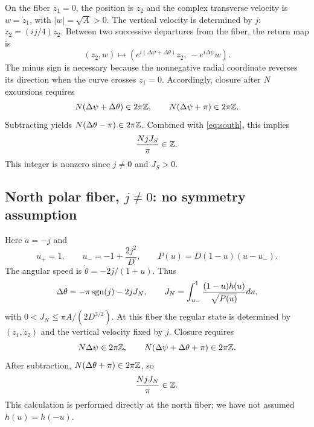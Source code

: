 \documentclass[11pt,a4paper]{article}
\theoremstyle{remark}\newtheorem{remark}[theorem]{Remark}
\begin{document}
On the fiber $z_1=0$, the position is $z_2$ and the complex transverse velocity is $w=\dot z_1$, with $|w|=\sqrt A>0$. The vertical velocity is determined by $j$: $\dot z_2=(ij/4)z_2$. Between two successive departures from the fiber, the return map is
\[
(z_2,w)\longmapsto\left(e^{i(\Delta\psi+\Delta\theta)}z_2,\,-e^{i\Delta\psi}w\right).
\]
The minus sign is necessary because the nonnegative radial coordinate reverses its direction when the curve crosses $z_1=0$. Accordingly, closure after $N$ excursions requires
\[
N(\Delta\psi+\Delta\theta)\in2\pi\mathbb Z,\qquad N(\Delta\psi+\pi)\in2\pi\mathbb Z.
\]
Subtracting yields $N(\Delta\theta-\pi)\in2\pi\mathbb Z$. Combined with \eqref{eq:south}, this implies
\begin{equation}\label{eq:integerS}
\frac{NjJ_S}{\pi}\in\mathbb Z.
\end{equation}
This integer is nonzero since $j\ne0$ and $J_S>0$.

\subsection{North polar fiber, $j\ne0$: no symmetry assumption}
Here $a=-j$ and
\[
u_+=1,\qquad u_-=-1+\frac{2j^2}{D},\qquad P(u)=D(1-u)(u-u_-).
\]
The angular speed is $\dot\theta=-2j/(1+u)$. Thus
\[
\Delta\theta=-\pi\operatorname{sgn}(j)-2jJ_N,\qquad
J_N=\int_{u_-}^{1}\frac{(1-u)h(u)}{\sqrt{P(u)}}du,
\]
with $0<J_N\le\pi A/(2D^{3/2})$. At this fiber the regular state is determined by $(z_1,\dot z_2)$ and the vertical velocity fixed by $j$. Closure requires
\[
N\Delta\psi\in2\pi\mathbb Z,\qquad N(\Delta\psi+\Delta\theta+\pi)\in2\pi\mathbb Z.
\]
After subtraction, $N(\Delta\theta+\pi)\in2\pi\mathbb Z$, so
\begin{equation}\label{eq:integerN}
\frac{NjJ_N}{\pi}\in\mathbb Z.
\end{equation}
This calculation is performed directly at the north fiber; we have not assumed $h(u)=h(-u)$.
\end{document}
